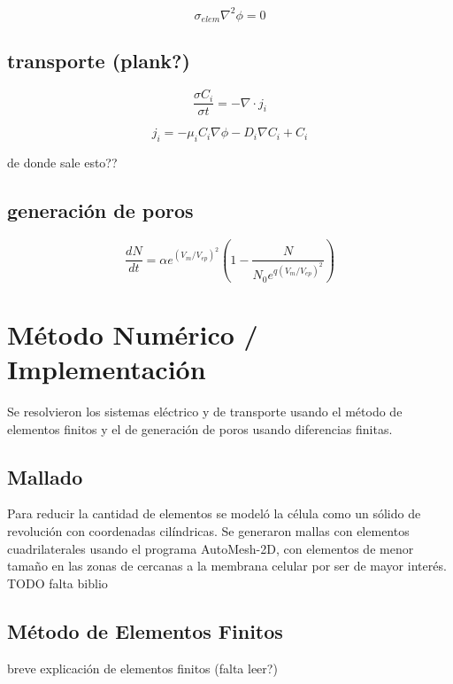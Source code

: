 \documentclass[11pt,a4paper,twoside]{tesis}
\begin{document}
\begin{equation}
	\sigma_{elem} \nabla^{2} \phi = 0 
\end{equation}

\section{transporte (plank?)}

\begin{equation}
	\frac{\sigma C_i}{\sigma t} = -\nabla \cdot j_i
\end{equation}

\begin{equation}
	j_i = -\mu_i C_i \nabla \phi - D_i \nabla C_i + C_i
\end{equation}

de donde sale esto??

\section{generación de poros}
\begin{equation}
	\frac{dN}{dt} = \alpha e^{(V_m/V_{ep})^2} \left( 1 - \frac{N}{N_0 e^{q \left(V_m/V_{ep} \right) ^2}} \right)
\end{equation}



\chapter{Método Numérico / Implementación}

Se resolvieron los sistemas eléctrico y de transporte usando el método de elementos finitos y el de generación de poros usando diferencias finitas.

\section{Mallado}
Para reducir la cantidad de elementos se modeló la célula como un sólido de revolución con coordenadas cilíndricas. Se generaron mallas con elementos cuadrilaterales usando el programa AutoMesh-2D, con elementos de menor tamaño en las zonas de cercanas a la membrana celular por ser de mayor interés.
TODO falta biblio

\section{Método de Elementos Finitos}
breve explicación de elementos finitos (falta leer?)
\end{document}
